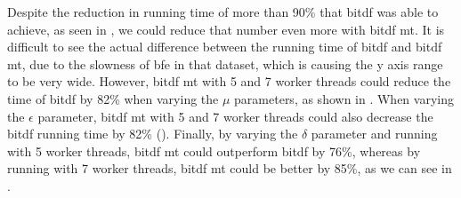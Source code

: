 {Despite the reduction in running time of more than 90\% that \ac{bitdf} was able to achieve, as seen in
, we could reduce that number even more with \ac{bitdf} \ac{mt}. It is difficult to see the actual
difference between the running time of \ac{bitdf} and \ac{bitdf} \ac{mt}, due to the slowness of \ac{bfe} in that
dataset, which is causing the y axis range to be very wide. However, \ac{bitdf} \ac{mt} with 5 and 7 worker threads
could reduce the time of \ac{bitdf} by 82\% when varying the $\mu$ parameters, as shown in
. When varying the $\epsilon$ parameter, \ac{bitdf} \ac{mt} with 5 and 7 worker
threads could also decrease the \ac{bitdf} running time by 82\% (). Finally, by
varying the $\delta$ parameter and running with 5 worker threads, \ac{bitdf} \ac{mt} could outperform \ac{bitdf} by
76\%, whereas by running with 7 worker threads, \ac{bitdf} \ac{mt} could be better by 85\%, as we can see in
.

}
